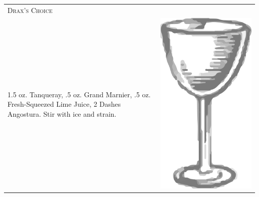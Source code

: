 \documentclass{article}
\begin{document}
\begin{tabular}{p{2in} p{0.5in}}
	\multicolumn{2}{p{3in}}{\centering\Huge\textsc{Drax's Choice}}\\ 
	  \vspace{-0.1in}1.5 oz. Tanqueray, .5 oz. Grand Marnier, .5 oz. Fresh-Squeezed Lime Juice, 2 Dashes Angostura. Stir with ice and strain. &
	  \vspace{-0.1in} \includegraphics{nick_and_nora.png}
\end{tabular}\\
\end{document}
